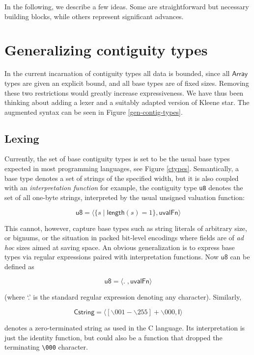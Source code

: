 \documentclass{article}
\newcommand{\konst}[1]{\ensuremath{\mathsf{#1}}}
\newcommand{\set}[1]{\ensuremath{\{ {#1} \}}}
\theoremstyle{definition}
\begin{document}
In the following, we describe a few ideas. Some are straightforward
but necessary building blocks, while others represent significant
advances.

\section{Generalizing contiguity types}

In the current incarnation of contiguity types all data is bounded,
since all \konst{Array} types are given an explicit bound, and all
base types are of fixed sizes. Removing these two restrictions would
greatly increase expressiveness. We have thus been thinking about
adding a lexer and a suitably adapted version of Kleene star. The
augmented syntax can be seen in Figure \ref{gen-contig-types}.

\subsection{Lexing}

Currently, the set of base contiguity types is set to be the usual
base types expected in most programming languages, see Figure
\ref{ctypes}. Semantically, a base type denotes a set of strings of
the specified width, but it is also coupled with an
\emph{interpretation function} for example, the contiguity type
\verb+u8+ denotes the set of all one-byte strings, interpreted by the
usual unsigned valuation function:

  \[ \konst{u8} = \langle \set{s \mid \konst{length}(s) = 1}, \konst{uvalFn} \rangle
  \]

  This cannot, however, capture base types such as string literals of
  arbitrary size, or bignums, or the situation in packed
  bit-level encodings where fields are of \emph{ad hoc} sizes aimed at
  saving space. An obvious generalization is to express base types via
  regular expressions paired with interpretation functions. Now \konst{u8}
  can be defined as

  \[ \konst{u8} = \langle . \; , \konst{uvalFn} \rangle
  \]

\noindent (where `.' is the standard regular expression denoting any character). Similarly,

  \[ \konst{Cstring} = \langle [\backslash 001-\backslash 255]+ \backslash 000, \konst{I} \rangle
  \]

\noindent denotes a zero-terminated string as used in the C
language. Its interpretation is just the identity function, but could
also be a function that dropped the terminating \verb+\000+ character.
\end{document}
